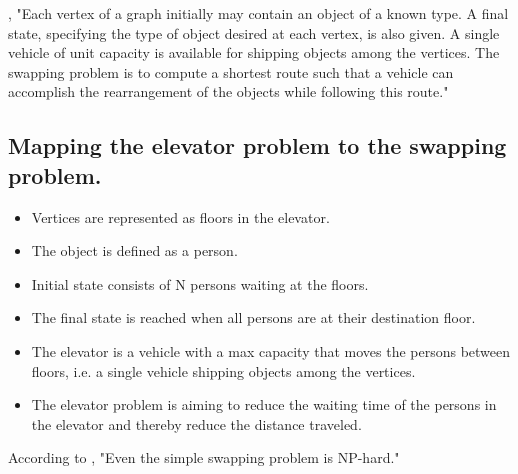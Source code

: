 

\cite{anily1992swapping}, "Each vertex of a graph initially may contain an object of a known type. A final state, specifying the type of object desired at each vertex, is also given. A single vehicle of unit capacity is available for shipping objects among the vertices. The swapping problem is to compute a shortest route such that a vehicle can accomplish the rearrangement of the objects while following this route."
\subsection{Mapping the elevator problem to the swapping problem.}
\begin{itemize}
	\item Vertices are represented as floors in the elevator.
	\item The object is defined as a person.
	\item Initial state consists of N persons waiting at the floors.
	\item The final state is reached when all persons are at their destination floor.
	\item The elevator is a vehicle with a max capacity that moves the persons between floors, i.e. a single vehicle shipping objects among the vertices.
	\item The elevator problem is aiming to reduce the waiting time of the persons in the elevator and thereby reduce the distance traveled.
\end{itemize}

According to \cite{anily1992swapping},  "Even the simple swapping problem is NP-hard."
